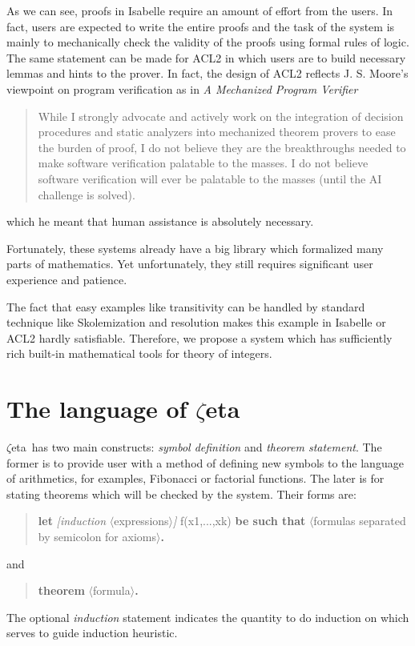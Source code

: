 \documentclass[12pt]{article}
\newcommand{\zetatp}{$\zeta$eta}
\begin{document}
As we can see, proofs in Isabelle require an amount of effort from the users. In fact, users are expected to write the entire proofs and the task of the system is mainly to mechanically check the validity of the proofs using formal rules of logic. The same statement can be made for ACL2 in which users are to build necessary lemmas and hints to the prover. In fact, the design of ACL2 reflects J. S. Moore's viewpoint on program verification as in \emph{A Mechanized Program Verifier}
\begin{quote}
\scriptsize{While I strongly advocate and actively work on the integration of decision procedures and static
analyzers into mechanized theorem provers to ease the burden of proof, I do not believe they are
the breakthroughs needed to make software verification palatable to the masses. I do not believe
software verification will ever be palatable to the masses (until the AI challenge is solved).}
\end{quote}
which he meant that human assistance is absolutely necessary.

Fortunately, these systems already have a big library which formalized many parts of mathematics. Yet unfortunately, they still requires significant user experience and patience.


The fact that easy examples like transitivity can be handled by standard technique like Skolemization and resolution makes this example in Isabelle or ACL2 hardly satisfiable. Therefore, we propose a system which has sufficiently rich built-in mathematical tools for theory of integers.

\section{The language of \zetatp}

\zetatp\ has two main constructs: \emph{symbol definition} and \emph{theorem statement}. The former is to provide user with a method of defining new symbols to the language of arithmetics, for examples, Fibonacci or factorial functions. The later is for stating theorems which will be checked by the system. Their forms are:
\begin{quote}
{\bf let} {\it [induction} $\langle$expressions$\rangle${\it]} f(x1,...,xk) {\bf be such that} $\langle$formulas separated by semicolon for axioms$\rangle${\bf .}
\end{quote}
and
\begin{quote}
{\bf theorem} $\langle$formula$\rangle${\bf .}
\end{quote}
The optional {\it induction} statement indicates the quantity to do induction on which serves to guide induction heuristic.
\end{document}
